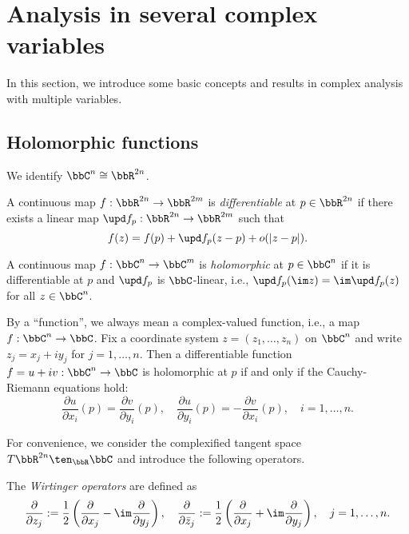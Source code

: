 \section{Analysis in several complex variables}

In this section, we introduce some basic concepts and results in complex analysis with multiple variables.

\subsection{Holomorphic functions}

    We identify \(\bbC^n \cong \bbR^{2n}\).

    \begin{definition}\label{def:differentiable_and_holomorphic_map}
        A continuous map \(f: \bbR^{2n} \to \bbR^{2m}\) is \emph{differentiable} at \(p \in \bbR^{2n}\) if there exists a linear map \(\upd f_p: \bbR^{2n} \to \bbR^{2m}\) such that 
        \[ f(z) = f(p) + \upd f_p(z - p) + o(|z - p|). \]

        A continuous map \(f: \bbC^n \to \bbC^m\) is \emph{holomorphic} at \(p \in \bbC^n\) if it is differentiable at \(p\) and \(\upd f_p\) is \(\bbC\)-linear, i.e., \(\upd f_p(\im z) = \im \upd f_p(z)\) for all \(z \in \bbC^n\).
    \end{definition}

    By a ``function'', we always mean a complex-valued function, i.e., a map \(f: \bbC^n \to \bbC\).
    Fix a coordinate system \(z = (z_1, \ldots, z_n)\) on \(\bbC^n\) and write \(z_j = x_j + iy_j\) for \(j = 1, \ldots, n\).
    Then a differentiable function \(f = u+iv: \bbC^n \to \bbC\) is holomorphic at \(p\) if and only if the Cauchy-Riemann equations hold:
    \[ \frac{\partial u}{\partial x_i}(p) = \frac{\partial v}{\partial y_i}(p), \quad \frac{\partial u}{\partial y_i}(p) = -\frac{\partial v}{\partial x_i}(p), \quad i = 1, \ldots, n. \]
    
    For convenience, we consider the complexified tangent space \(T\bbR^{2n} \ten_\bbR \bbC\) and introduce the following operators.

    \begin{definition}\label{def:Wirtinger_operators}
        The \emph{Wirtinger operators} are defined as 
        \[ \frac{\partial}{\partial z_j} := \frac{1}{2} \left( \frac{\partial}{\partial x_j} - \im \frac{\partial}{\partial y_j} \right), \quad \frac{\partial}{\partial \bar{z}_j} := \frac{1}{2} \left( \frac{\partial}{\partial x_j} + \im \frac{\partial}{\partial y_j} \right), \quad j = 1, \ldots, n. \]
    \end{definition}


